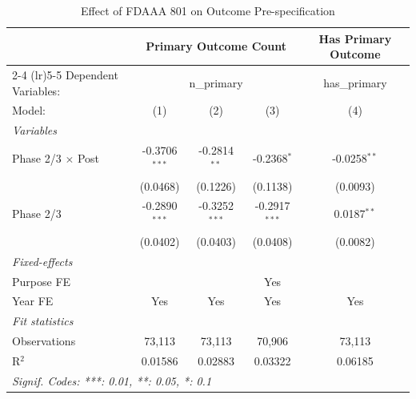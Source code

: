 
\begin{table}[htbp]
   \caption{\label{tab:mechanism} Effect of FDAAA 801 on Outcome Pre-specification}
   \centering
   \begin{tabular}{lcccc}
      \tabularnewline \midrule \midrule
       & \multicolumn{3}{c}{Primary Outcome Count} & Has Primary Outcome \\ \cmidrule(lr){2-4} \cmidrule(lr){5-5}
      Dependent Variables: & \multicolumn{3}{c}{n\_primary} & has\_primary\\
      Model:                   & (1)             & (2)             & (3)             & (4)\\  
      \midrule
      \emph{Variables}\\
      Phase 2/3 $\times$ Post  & -0.3706$^{***}$ & -0.2814$^{**}$  & -0.2368$^{*}$   & -0.0258$^{**}$\\   
                               & (0.0468)        & (0.1226)        & (0.1138)        & (0.0093)\\   
      Phase 2/3                & -0.2890$^{***}$ & -0.3252$^{***}$ & -0.2917$^{***}$ & 0.0187$^{**}$\\   
                               & (0.0402)        & (0.0403)        & (0.0408)        & (0.0082)\\   
      \midrule
      \emph{Fixed-effects}\\
      Purpose FE               &                 &                 & Yes             & \\  
      Year FE                  & Yes             & Yes             & Yes             & Yes\\  
      \midrule
      \emph{Fit statistics}\\
      Observations             & 73,113          & 73,113          & 70,906          & 73,113\\  
      R$^2$                    & 0.01586         & 0.02883         & 0.03322         & 0.06185\\  
      \midrule \midrule
      \multicolumn{5}{l}{\emph{Signif. Codes: ***: 0.01, **: 0.05, *: 0.1}}\\
   \end{tabular}
\par{}
\end{table}
